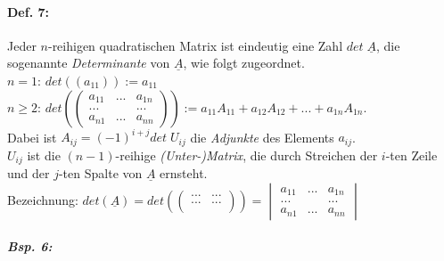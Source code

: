 \paragraph{Def. 7:} \parskp
Jeder $n$-reihigen quadratischen Matrix ist eindeutig eine Zahl $det\;\underline{A}$, die sogenannte \emph{Determinante} von $\underline{A}$, wie folgt zugeordnet.\\
$n=1$: $det\left((a_{11})\right):=a_{11}$\\
$n\geq 2$: $det\left(\begin{pmatrix}
a_{11} & ... & a_{1n}\\
...	&	& ...\\
a_{n1} &...&a_{nn}
\end{pmatrix}
\right):= a_{11}A_{11}+a_{12}A_{12}+...+a_{1n}A_{1n}$.\\
Dabei ist $A_{ij}=(-1)^{i+j} det\; U_{ij}$ die \emph{Adjunkte} des Elements $a_{ij}$.\\
$U_{ij}$ ist die $(n-1)$-reihige \emph{(Unter-)Matrix}, die durch Streichen der $i$-ten Zeile und der $j$-ten Spalte von $\underline{A}$ ernsteht.\\
Bezeichnung: $det(\underline{A})=det\left(\begin{pmatrix}
... & ...\\
... & ...\\
\end{pmatrix}\right)=\begin{vmatrix}
a_{11} & ... & a_{1n}\\
...	&	& ...\\
a_{n1} &...&a_{nn}
\end{vmatrix}$
\subparagraph{Bsp. 6:}
